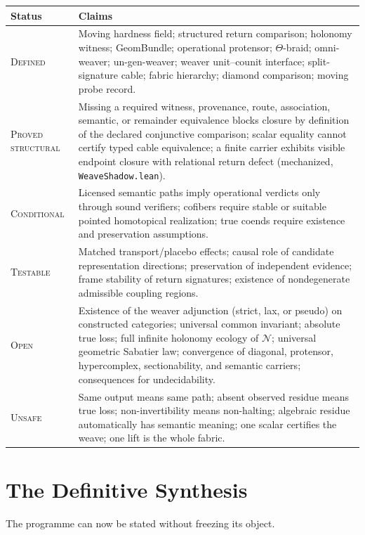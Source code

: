 \documentclass[12pt,openany]{book}
\theoremstyle{remark}
\newcommand{\Nfabric}{\mathcal N}
\begin{document}
\begin{longtable}{>{\raggedright\arraybackslash}p{}>{\raggedright\arraybackslash}p{}}
\toprule
Status & Claims \\
\midrule
\endhead
\textsc{Defined} & Moving hardness field; structured return comparison; holonomy witness; GeomBundle; operational protensor; $\Theta$-braid; omni-weaver; un-gen-weaver; weaver unit--counit interface; split-signature cable; fabric hierarchy; diamond comparison; moving probe record. \\
\textsc{Proved structural} & Missing a required witness, provenance, route, association, semantic, or remainder equivalence blocks closure by definition of the declared conjunctive comparison; scalar equality cannot certify typed cable equivalence; a finite carrier exhibits visible endpoint closure with relational return defect (mechanized, \texttt{WeaveShadow.lean}). \\
\textsc{Conditional} & Licensed semantic paths imply operational verdicts only through sound verifiers; cofibers require stable or suitable pointed homotopical realization; true coends require existence and preservation assumptions. \\
\textsc{Testable} & Matched transport/placebo effects; causal role of candidate representation directions; preservation of independent evidence; frame stability of return signatures; existence of nondegenerate admissible coupling regions. \\
\textsc{Open} & Existence of the weaver adjunction (strict, lax, or pseudo) on constructed categories; universal common invariant; absolute true loss; full infinite holonomy ecology of $\Nfabric$; universal geometric Sabatier law; convergence of diagonal, protensor, hypercomplex, sectionability, and semantic carriers; consequences for undecidability. \\
\textsc{Unsafe} & Same output means same path; absent observed residue means true loss; non-invertibility means non-halting; algebraic residue automatically has semantic meaning; one scalar certifies the weave; one lift is the whole fabric. \\
\bottomrule
\end{longtable}

\chapter{The Definitive Synthesis}
\label{ch:synthesis}

The programme can now be stated without freezing its object.
\end{document}
